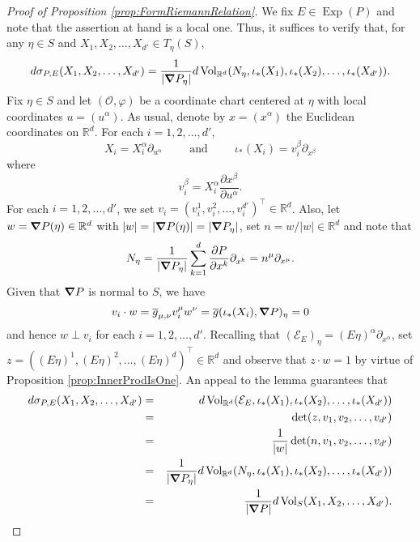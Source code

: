 \documentclass[11pt]{article}
\newcommand\Exp{\operatorname{Exp}}
\renewcommand\det{\operatorname{det}}
\newcommand{\Vol}{\operatorname{Vol}}
\begin{document}
\begin{proof}[Proof of Proposition \ref{prop:FormRiemannRelation}]
We fix $E\in\Exp(P)$ and note that the assertion at hand is a local one. Thus, it suffices to verify that, for any $\eta\in S$ and $X_1,X_2,\dots,X_{d'}\in T_\eta(S)$, 
\begin{equation*}
    d\sigma_{P,E}(X_1,X_2,\dots,X_{d'})=\frac{1}{|\grad P_{\eta}|}d\Vol_{\mathbb{R}^d}(N_\eta,\iota_*(X_1),\iota_*(X_2),\dots,\iota_*(X_{d'})).
\end{equation*}
Fix $\eta\in S$ and let $(\mathcal{O},\varphi)$ be a coordinate chart centered at $\eta$ with local coordinates $u=(u^{\alpha})$. As usual, denote by $x=(x^{\alpha})$ the Euclidean coordinates on $\mathbb{R}^d$.  For each $i=1,2,\dots,{d'}$, \begin{equation*}
X_i=X_i^\alpha \partial_{u^{\alpha}}\hspace{1cm}\mbox{and}\hspace{1cm}\iota_*(X_i)=v_i^\beta\partial_{x^{\beta}}
\end{equation*}
where
\begin{equation*}
v_i^\beta =X_i^\alpha\frac{\partial x^\beta}{\partial u^\alpha}.
\end{equation*}
For each $i=1,2,\dots,d'$, we set $v_i=(v_i^1,v_i^2,\dots,v_i^{d'})^\top\in\mathbb{R}^d$. Also, let $w=\grad P(\eta)\in\mathbb{R}^d$ with $|w|=|\grad P(\eta)|=|\grad P_\eta|$, set $n=w/|w|\in\mathbb{R}^d$ and note that
\begin{equation*}
    N_\eta=\frac{1}{|\grad P_\eta|}\sum_{k=1}^d\frac{\partial P}{\partial x^{k}}\partial_{x^k}=n^{\mu}\partial_{x^\mu}.
\end{equation*}Given that $\grad P$ is normal to $S$, we have
\begin{equation*}
    v_i\cdot w=\overline{g}_{\mu,\nu}v_i^\mu w^\nu= \overline{g}(\iota_*(X_i),\grad P)_\eta=0
\end{equation*}
and hence $w\perp v_i$ for each $i=1,2,\dots,{d'}$. Recalling that $(\mathcal{E}_E)_\eta=(E\eta)^\alpha\partial_{x^{\alpha}}$, set $z=((E\eta)^1,(E\eta)^2,\dots,(E\eta)^d)^\top\in\mathbb{R}^d$ and observe that $z\cdot w=1$ by virtue of Proposition \ref{prop:InnerProdIsOne}. An appeal to the lemma guarantees that
\begin{eqnarray*}
d\sigma_{P,E}(X_1,X_2,\dots,X_{d'})&=&d\Vol_{\mathbb{R}^d}(\mathcal{E}_E,\iota_*(X_1),\iota_*(X_2),\dots,\iota_*(X_{d'}))\\
&=&\det(z,v_1,v_2,\dots,v_{d'})\\
&=&\frac{1}{|w|}\det(n,v_1,v_2,\dots,v_{d'})\\
&=&\frac{1}{|\grad P_\eta|}d\Vol_{\mathbb{R}^d}(N_\eta,\iota_*(X_1),\iota_*(X_2),\dots,\iota_*(X_{d'}))\\
&=&\frac{1}{|\grad P|}d\Vol_S(X_1,X_2,\dots,X_{d'}).
\end{eqnarray*}
\end{proof}
\end{document}
